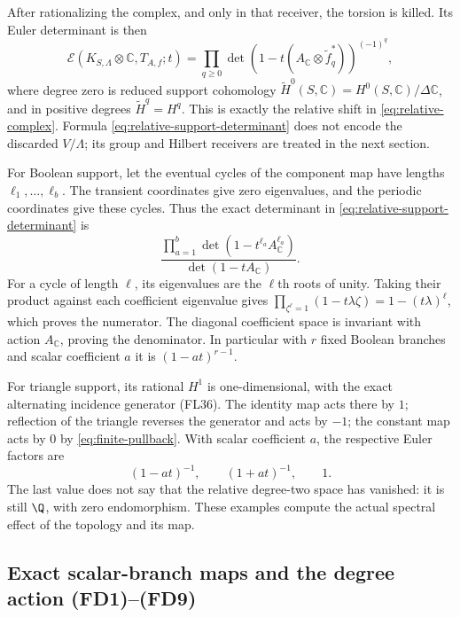 \documentclass[11pt,a4paper]{article}
\theoremstyle{definition}\newtheorem{definition}[theorem]{Definition}
\newcommand{\C}{\mathbb C}\newcommand{\R}{\mathbb R}
\begin{document}
After rationalizing the complex, and only in that receiver, the
torsion is killed. Its Euler determinant is then
\[
 \mathcal E(K_{S,\Lambda}\otimes\C,T_{A,f};t)
 =\prod_{q\ge0}
 \det\left(1-t(A_\C\otimes\widetilde f_q^*)\right)^{(-1)^q},
 \tag{SE19}\label{eq:relative-support-determinant}
\]
where degree zero is reduced support cohomology
$\widetilde H^0(S,\C)=H^0(S,\C)/\Delta\C$, and in positive degrees
$\widetilde H^q=H^q$. This is exactly the relative shift in
\eqref{eq:relative-complex}. Formula \eqref{eq:relative-support-determinant}
does not encode the discarded $V/\Lambda$; its group and Hilbert
receivers are treated in the next section.

For Boolean support, let the eventual cycles of the component map
have lengths $\ell_1,\ldots,\ell_b$. The transient coordinates give
zero eigenvalues, and the periodic coordinates give these cycles.
Thus the exact determinant in \eqref{eq:relative-support-determinant}
is
\[
 \frac{\prod_{a=1}^b\det(1-t^{\ell_a}A_\C^{\ell_a})}
      {\det(1-tA_\C)}.
 \tag{SE20}\label{eq:boolean-determinant}
\]
For a cycle of length $\ell$, its eigenvalues are the $\ell$th roots
of unity. Taking their product against each coefficient eigenvalue
gives $\prod_{\zeta^\ell=1}(1-t\lambda\zeta)=1-(t\lambda)^\ell$,
which proves the numerator. The diagonal coefficient space is
invariant with action $A_\C$, proving the denominator. In particular
with $r$ fixed Boolean branches and scalar coefficient $a$ it is
$(1-at)^{r-1}$.

For triangle support, its rational $H^1$ is one-dimensional, with
the exact alternating incidence generator (FL36). The identity map
acts there by $1$; reflection of the triangle reverses the generator
and acts by $-1$; the constant map acts by $0$ by
\eqref{eq:finite-pullback}. With scalar coefficient $a$, the respective
Euler factors are
\[
 (1-at)^{-1},\qquad(1+at)^{-1},\qquad1.
 \tag{SE21}\label{eq:triangle-determinants}
\]
The last value does not say that the relative degree-two space has
vanished: it is still $\Q$, with zero endomorphism. These examples
compute the actual spectral effect of the topology and its map.

\subsection{Exact scalar-branch maps and the degree action (FD1)--(FD9)}
\end{document}
